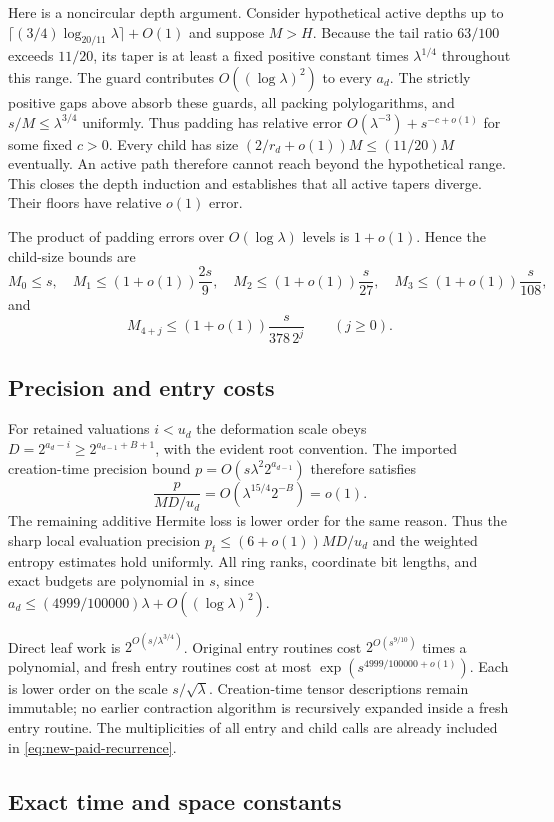 Here is a noncircular depth argument. Consider hypothetical active depths
up to $\lceil(3/4)\log_{20/11}\lambda\rceil+O(1)$ and suppose $M>H$.
Because the tail ratio $63/100$ exceeds $11/20$, its taper is at least
a fixed positive constant times $\lambda^{1/4}$ throughout this range.
The guard contributes $O((\log\lambda)^2)$ to every $a_d$. The strictly
positive gaps above absorb these guards, all packing polylogarithms, and
$s/M\le\lambda^{3/4}$ uniformly. Thus padding has relative error
$O(\lambda^{-3})+s^{-c+o(1)}$ for some fixed $c>0$. Every child has size
$(2/r_d+o(1))M\le(11/20)M$ eventually. An active path therefore cannot
reach beyond the hypothetical range. This closes the depth induction and
establishes that all active tapers diverge. Their floors have relative
$o(1)$ error.

The product of padding errors over $O(\log\lambda)$ levels is $1+o(1)$.
Hence the child-size bounds are
\[
 M_0\le s,\quad M_1\le(1+o(1))\frac{2s}{9},\quad
 M_2\le(1+o(1))\frac{s}{27},\quad
 M_3\le(1+o(1))\frac{s}{108},
\]
and
\[
 M_{4+j}\le(1+o(1))\frac{s}{378\,2^j}\qquad(j\ge0).
\]

\subsection{Precision and entry costs}

For retained valuations $i<u_d$ the deformation scale obeys
$D=2^{a_d-i}\ge2^{a_{d-1}+B+1}$, with the evident root convention.
The imported creation-time precision bound
$p=O(s\lambda^2 2^{a_{d-1}})$ therefore satisfies
\[
 \frac{p}{MD/u_d}=O(\lambda^{15/4}2^{-B})=o(1).
\]
The remaining additive Hermite loss is lower order for the same reason.
Thus the sharp local evaluation precision
$p_t\le(6+o(1))MD/u_d$ and the weighted entropy estimates hold uniformly.
All ring ranks, coordinate bit lengths, and exact budgets are polynomial
in $s$, since $a_d\le(4999/100000)\lambda+O((\log\lambda)^2)$.

Direct leaf work is $2^{O(s/\lambda^{3/4})}$. Original entry routines cost
$2^{O(s^{9/10})}$ times a polynomial, and fresh entry routines cost at most
$\exp(s^{4999/100000+o(1)})$. Each is lower order on the scale
$s/\sqrt\lambda$. Creation-time tensor descriptions remain immutable;
no earlier contraction algorithm is recursively expanded inside a fresh
entry routine. The multiplicities of all entry and child calls are already
included in \eqref{eq:new-paid-recurrence}.

\subsection{Exact time and space constants}

